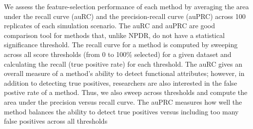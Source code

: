 \documentclass{bioinfo}
\begin{document}
We assess the feature-selection performance of each method by averaging the area under the recall curve (auRC) and the precision-recall curve (auPRC) across 100 replicates of each simulation scenario.
The auRC and auPRC are good comparison tool for methods that, unlike NPDR, do not have a statistical significance threshold.
The recall curve for a method is computed by sweeping across all score thresholds (from 0 to 100\% selected) for a given dataset and calculating the recall (true positive rate) for each threshold. The auRC gives an overall measure of a method's ability to detect functional attributes; however, in addition to detecting true positives, researchers are also interested in the false postive rate of a method. Thus, we also sweep across thresholds and compute the area under the precision versus recall curve. The auPRC measures how well the method balances the ability to detect true positives versus including too many false positives across all thresholds
\end{document}
